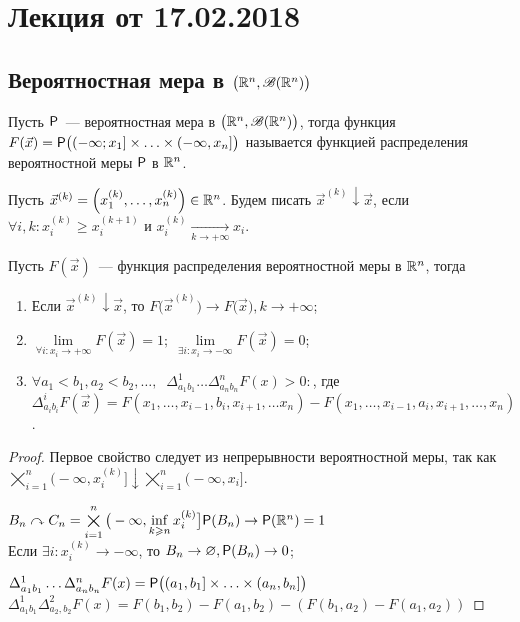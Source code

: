 \section{Лекция от 17.02.2018}
\subsection{Вероятностная мера в $\big( \R^n, \B(\R^n) \big)$}
\begin{definition}
	Пусть $\P$~--- вероятностная мера в $\big( \R^n, \B(\R^n) \big)$, тогда функция $F(\vec x) = \P\big((-\infty; x_1] \times \ldots \times (-\infty, x_n]\big)$ называется функцией распределения вероятностной меры $\P$ в $\R^n$.
\end{definition}
\begin{note}
	Пусть $\vec x^{(k)} = \left(x_1^{(k)}, \ldots, x_n^{(k)}\right) \in \R^n$. Будем писать $\vec x^{(k)} \downarrow \vec x$, если $\forall i, k : x_i^{(k)} \geqslant x_i^{(k + 1)}$ и $x_i^{(k)} \underset{k \rightarrow +\infty}{\longrightarrow} x_i$.
\end{note}
\begin{lemma}
	Пусть $F(\vec x)$~--- функция распределения вероятностной меры в $\R^n$, тогда
	\begin{enumerate}
		\item Если $\vec x^{(k)} \downarrow \vec x$, то $F\big(\vec x^{(k)}\big) \rightarrow F\big(\vec x\big), k \rightarrow +\infty$;
		\item $\lim\limits_{\forall i : x_i \rightarrow +\infty} F(\vec x) = 1;\; \lim\limits_{\exists i : x_i \rightarrow -\infty} F(\vec x) = 0$;
		\item $\forall a_1 < b_1, a_2 < b_2, \ldots,\;\; \Delta_{a_1b_1}^1 \ldots \Delta_{a_nb_n}^nF(x) > 0 :$, где \\
		$\Delta_{a_ib_i}^i F(\vec x) = F(x_1, \ldots, x_{i - 1}, b_i, x_{i + 1}, \ldots x_n) - F(x_1, \ldots, x_{i - 1}, a_i, x_{i + 1}, \ldots, x_n)$.
	\end{enumerate}
	\begin{proof}
		Первое свойство следует из непрерывности вероятностной меры, так как $\bigtimes\limits_{i = 1}^n\big(-\infty, x_i^{(k)}\big] \downarrow \bigtimes\limits_{i = 1}^n \big(-\infty, x_i\big]$. \\
		\medskip
		
		$B_n \curvearrowright C_n = \bigtimes\limits_{i = 1}^n\big(-\infty, \inf\limits_{k \geqslant n} x_i^{(k)}\big] \\
		\P(B_n) \rightarrow \P(\R^n) = 1$ \\
		Если $\exists i : x_i^{(k)} \rightarrow - \infty$, то $B_n \rightarrow \varnothing, \P(B_n) \rightarrow 0$;
		\medskip
		
		$\Delta_{a_1b_1}^1 \ldots \Delta_{a_nb_n}^nF(x) = \P\big((a_1, b_1] \times \ldots \times (a_n, b_n]\big)$ \\
		$\Delta_{a_1b_1}^1\Delta_{a_2,b_2}^2F(x) = F(b_1,b_2) - F(a_1,b_2) - (F(b_1,a_2) - F(a_1,a_2))$
	\end{proof}
\end{lemma}
